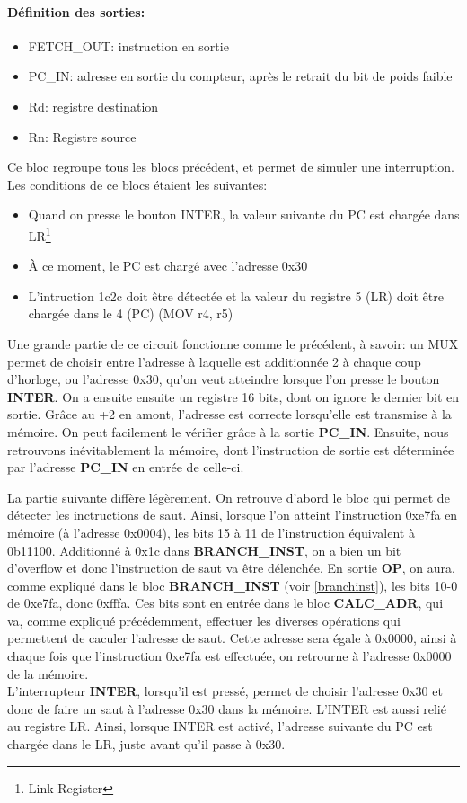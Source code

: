 \documentclass[a4paper]{article} %
\begin{document}
\paragraph{Définition des sorties:}
\begin{itemize}
    \item FETCH\_OUT: instruction en sortie
    \item PC\_IN: adresse en sortie du compteur, après le retrait du bit de poids faible
    \item Rd: registre destination
    \item Rn: Registre source
\end{itemize}
\medskip
Ce bloc regroupe tous les blocs précédent, et permet de simuler une interruption. Les conditions de ce blocs étaient les suivantes:
\begin{itemize}
   \item Quand on presse le bouton INTER, la valeur suivante du PC est chargée dans LR\footnote{Link Register}
   \item À ce moment, le PC est chargé avec l'adresse 0x30
   \item L'intruction 1c2c doit être détectée et la valeur du registre 5 (LR) doit être chargée dans le 4 (PC) (MOV r4, r5)
\end{itemize}
\medskip
Une grande partie de ce circuit fonctionne comme le précédent, à savoir: un MUX permet de choisir entre l'adresse à laquelle est additionnée 2 à chaque coup d'horloge, ou l'adresse 0x30, qu'on veut atteindre lorsque l'on presse le bouton \textbf{INTER}. On a ensuite ensuite un registre 16 bits, dont on ignore le dernier bit en sortie. Grâce au +2 en amont, l'adresse est correcte lorsqu'elle est transmise à la mémoire. On peut facilement le vérifier grâce à la sortie \textbf{PC\_IN}. Ensuite, nous retrouvons inévitablement la mémoire, dont l'instruction de sortie est déterminée par l'adresse \textbf{PC\_IN} en entrée de celle-ci.\medskip

La partie suivante diffère légèrement. On retrouve d'abord le bloc  qui permet de détecter les inctructions de saut. Ainsi, lorsque l'on atteint l'instruction 0xe7fa en mémoire (à l'adresse 0x0004), les bits 15 à 11 de l'instruction équivalent à 0b11100. Additionné à 0x1c dans \textbf{BRANCH\_INST}, on a bien un bit d'overflow et donc l'instruction de saut va être délenchée. En sortie \textbf{OP}, on aura, comme expliqué dans le bloc \textbf{BRANCH\_INST} (voir \ref{branchinst}), les bits 10-0 de 0xe7fa, donc 0xfffa. Ces bits sont en entrée dans le bloc \textbf{CALC\_ADR}, qui va, comme expliqué précédemment, effectuer les diverses opérations qui permettent de caculer l'adresse de saut. Cette adresse sera égale à 0x0000, ainsi à chaque fois que l'instruction 0xe7fa est effectuée, on retrourne à l'adresse 0x0000 de la mémoire.\\
L'interrupteur \textbf{INTER}, lorsqu'il est pressé, permet de choisir l'adresse 0x30 et donc de faire un saut à l'adresse 0x30 dans la mémoire. L'INTER est aussi relié au registre LR. Ainsi, lorsque INTER est activé, l'adresse suivante du PC est chargée dans le LR, juste avant qu'il passe à 0x30.\medskip \\
\end{document}
